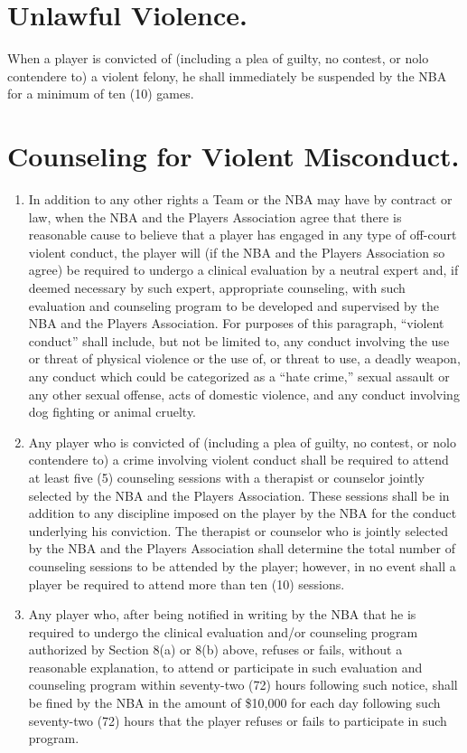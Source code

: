 \documentclass[
]{book}
\providecommand{\tightlist}{%
  \setlength{\itemsep}{0pt}\setlength{\parskip}{0pt}}
\begin{document}
\hypertarget{unlawful-violence.}{%
\section{Unlawful Violence.}\label{unlawful-violence.}}

When a player is convicted of (including a plea of guilty, no contest, or nolo contendere to) a violent felony, he shall immediately be suspended by the NBA for a minimum of ten (10) games.

\hypertarget{counseling-for-violent-misconduct.}{%
\section{Counseling for Violent Misconduct.}\label{counseling-for-violent-misconduct.}}

\begin{enumerate}
\def\labelenumi{(\alph{enumi})}
\tightlist
\item
  In addition to any other rights a Team or the NBA may have by contract or law, when the NBA and the Players Association agree that there is reasonable cause to believe that a player has engaged in any type of off-court violent conduct, the player will (if the NBA and the Players Association so agree) be required to undergo a clinical evaluation by a neutral expert and, if deemed necessary by such expert, appropriate counseling, with such evaluation and counseling program to be developed and supervised by the NBA and the Players Association. For purposes of this paragraph, ``violent conduct'' shall include, but not be limited to, any conduct involving the use or threat of physical violence or the use of, or threat to use, a deadly weapon, any conduct which could be categorized as a ``hate crime,'' sexual assault or any other sexual offense, acts of domestic violence, and any conduct involving dog fighting or animal cruelty.
\item
  Any player who is convicted of (including a plea of guilty, no contest, or nolo contendere to) a crime involving violent conduct shall be required to attend at least five (5) counseling sessions with a therapist or counselor jointly selected by the NBA and the Players Association. These sessions shall be in addition to any discipline imposed on the player by the NBA for the conduct underlying his conviction. The therapist or counselor who is jointly selected by the NBA and the Players Association shall determine the total number of counseling sessions to be attended by the player; however, in no event shall a player be required to attend more than ten (10) sessions.
\item
  Any player who, after being notified in writing by the NBA that he is required to undergo the clinical evaluation and/or counseling program authorized by Section 8(a) or 8(b) above, refuses or fails, without a reasonable explanation, to attend or participate in such evaluation and counseling program within seventy-two (72) hours following such notice, shall be fined by the NBA in the amount of \$10,000 for each day following such seventy-two (72) hours that the player refuses or fails to participate in such program.
\end{enumerate}
\end{document}
